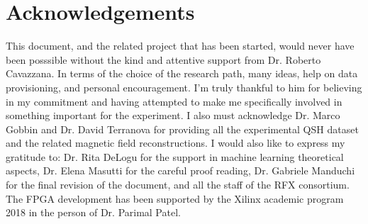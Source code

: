 
\clearpage
\chapter*{Acknowledgements}
\thispagestyle{empty}
This document, and the related project that has been started, would never have been
posssible without the kind and attentive support from Dr. Roberto Cavazzana. In terms of the choice of the research path, many ideas, help on data provisioning, and personal encouragement. I'm truly thankful to him for believing in my commitment and having attempted to make me specifically involved in something important for the experiment.
I also must acknowledge Dr. Marco Gobbin and Dr. David Terranova for providing all the experimental QSH dataset and the related magnetic field reconstructions.
I would also like to express my gratitude to: Dr. Rita DeLogu for the support in machine learning theoretical aspects, Dr. Elena Masutti for the careful proof reading, Dr. Gabriele Manduchi for the final revision of the document, and all the staff of the RFX consortium. \\
The FPGA development has been supported by the Xilinx academic program 2018 in the person of Dr. Parimal Patel.
\clearpage




